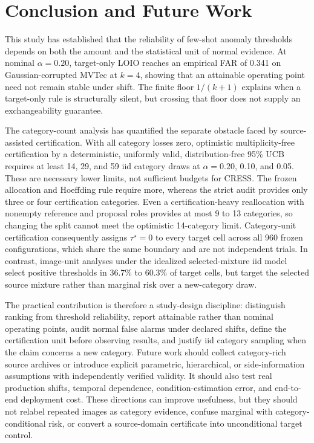 \section{Conclusion and Future Work}\label{sec:conclusion}
This study has established that the reliability of few-shot anomaly thresholds depends on both the amount and the statistical unit of normal evidence. At nominal $\alpha=0.20$, target-only LOIO reaches an empirical FAR of 0.341 on Gaussian-corrupted MVTec at $k=4$, showing that an attainable operating point need not remain stable under shift. The finite floor $1/(k+1)$ explains when a target-only rule is structurally silent, but crossing that floor does not supply an exchangeability guarantee.

The category-count analysis has quantified the separate obstacle faced by source-assisted certification. With all category losses zero, optimistic multiplicity-free certification by a deterministic, uniformly valid, distribution-free 95\% UCB requires at least 14, 29, and 59 iid category draws at $\alpha=0.20$, 0.10, and 0.05. These are necessary lower limits, not sufficient budgets for CRESS\@. The frozen allocation and Hoeffding rule require more, whereas the strict audit provides only three or four certification categories. Even a certification-heavy reallocation with nonempty reference and proposal roles provides at most 9 to 13 categories, so changing the split cannot meet the optimistic 14-category limit. Category-unit certification consequently assigns $\tau^\star=0$ to every target cell across all 960 frozen configurations, which share the same boundary and are not independent trials. In contrast, image-unit analyses under the idealized selected-mixture iid model select positive thresholds in 36.7\% to 60.3\% of target cells, but target the selected source mixture rather than marginal risk over a new-category draw.

The practical contribution is therefore a study-design discipline: distinguish ranking from threshold reliability, report attainable rather than nominal operating points, audit normal false alarms under declared shifts, define the certification unit before observing results, and justify iid category sampling when the claim concerns a new category. Future work should collect category-rich source archives or introduce explicit parametric, hierarchical, or side-information assumptions with independently verified validity. It should also test real production shifts, temporal dependence, condition-estimation error, and end-to-end deployment cost. These directions can improve usefulness, but they should not relabel repeated images as category evidence, confuse marginal with category-conditional risk, or convert a source-domain certificate into unconditional target control.
